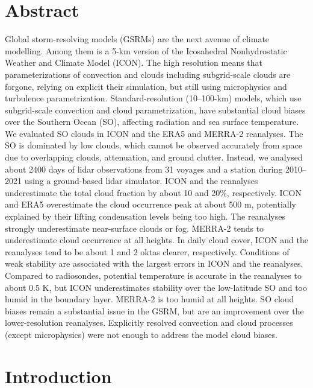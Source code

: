 \documentclass[12pt,a4paper]{article}
\begin{document}
\section*{Abstract}

Global storm-resolving models (GSRMs) are the next avenue of climate modelling.
Among them is a 5-km version of the Icosahedral Nonhydrostatic Weather and
Climate Model (ICON). The high resolution means that parameterizations of
convection and clouds including subgrid-scale clouds are forgone, relying on
explicit their simulation, but still using microphysics and turbulence
parametrization.  Standard-resolution (10--100-km) models, which use
subgrid-scale convection and cloud parametrization, have substantial cloud
biases over the Southern Ocean (SO), affecting radiation and sea surface
temperature.  We evaluated SO clouds in ICON and the ERA5 and MERRA-2
reanalyses.  The SO is dominated by low clouds, which cannot be observed
accurately from space due to overlapping clouds, attenuation, and ground
clutter.  Instead, we analysed about 2400 days of lidar observations from 31
voyages and a station during 2010--2021 using a ground-based lidar simulator.
ICON and the reanalyses underestimate the total cloud fraction by about 10 and
20\%, respectively. ICON and ERA5 overestimate the cloud occurrence peak at
about 500 m, potentially explained by their lifting condensation levels being
too high.  The reanalyses strongly underestimate near-surface clouds or fog.
MERRA-2 tends to underestimate cloud occurrence at all heights.  In daily cloud
cover, ICON and the reanalyses tend to be about 1 and 2 oktas clearer,
respectively.  Conditions of weak stability are associated with the largest
errors in ICON and the reanalyses.  Compared to radiosondes, potential
temperature is accurate in the reanalyses to about 0.5 K, but ICON
underestimates stability over the low-latitude SO and too humid in the boundary
layer. MERRA-2 is too humid at all heights. SO cloud biases remain a
substantial issue in the GSRM, but are an improvement over the lower-resolution
reanalyses. Explicitly resolved convection and cloud processes (except
microphysics) were not enough to address the model cloud biases.

\section{Introduction}
\label{sec:introduction}
\end{document}
